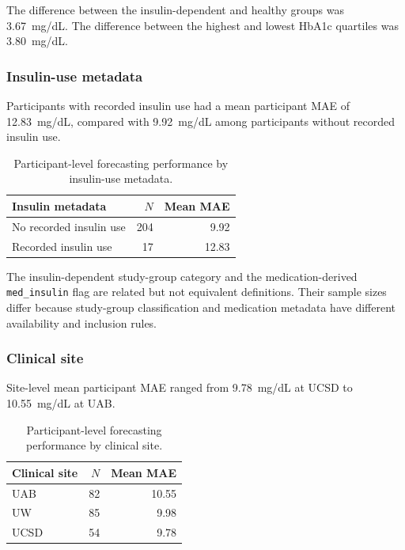 The difference between the insulin-dependent and healthy groups was
3.67~mg/dL. The difference between the highest and lowest HbA1c quartiles was
3.80~mg/dL.

\subsubsection{Insulin-use metadata}

Participants with recorded insulin use had a mean participant MAE of
12.83~mg/dL, compared with 9.92~mg/dL among participants without recorded
insulin use.

\begin{table}[H]
\centering
\caption{Participant-level forecasting performance by insulin-use metadata.}
\label{tab:insulin_forecasting}
\begin{tabular}{lrr}
\toprule
Insulin metadata & $N$ & Mean MAE \\
\midrule
No recorded insulin use & 204 & 9.92 \\
Recorded insulin use & 17 & 12.83 \\
\bottomrule
\end{tabular}
\end{table}

The insulin-dependent study-group category and the medication-derived
\texttt{med\_insulin} flag are related but not equivalent definitions. Their
sample sizes differ because study-group classification and medication metadata
have different availability and inclusion rules.

\subsubsection{Clinical site}

Site-level mean participant MAE ranged from 9.78~mg/dL at UCSD to
10.55~mg/dL at UAB.

\begin{table}[H]
\centering
\caption{Participant-level forecasting performance by clinical site.}
\label{tab:site_forecasting}
\begin{tabular}{lrr}
\toprule
Clinical site & $N$ & Mean MAE \\
\midrule
UAB & 82 & 10.55 \\
UW & 85 & 9.98 \\
UCSD & 54 & 9.78 \\
\bottomrule
\end{tabular}
\end{table}

